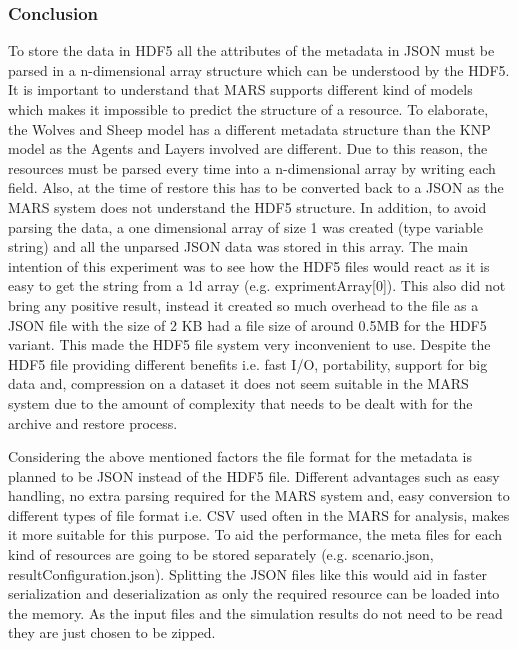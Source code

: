 \subsubsection{Conclusion}
    To store the data in HDF5 all the attributes of the metadata in JSON must be parsed in a n-dimensional array structure which can be understood by the HDF5. 
    It is important to understand that MARS supports different kind of models which makes it impossible to predict the structure of a resource. To elaborate, the
    Wolves and Sheep \cite{HAWHamburgMARS} model has a different metadata structure than the KNP \cite{HAWHamburgMARS} model as the Agents and Layers involved are 
    different. Due to this reason, the resources
    must be parsed every time into a n-dimensional array by writing each field. Also, at the time of restore this has to be converted back 
    to a JSON as the MARS system does not understand the HDF5 structure. In addition, to avoid parsing the data, 
    a one dimensional array of size 1 was created (type variable string) and all the unparsed JSON data
    was stored in this array. The main intention of this experiment was to see how the HDF5 files would react as it is easy to get the string from a 1d array 
    (e.g. exprimentArray[0]). This also did not bring any positive result, instead it created so much overhead to the file as a JSON file with the size of 2 KB
    had a file size of around 0.5MB for the HDF5 variant. This made the HDF5 file system very inconvenient to use.
    Despite the HDF5 file providing different benefits i.e. fast I/O, portability, support for big data and,
    compression on a dataset it does not seem suitable in the MARS system due to the amount of complexity that needs to be dealt with for the archive and restore process.
    

    Considering the above mentioned factors the file format for the metadata is planned to be JSON instead of the HDF5 file. Different advantages such as easy 
    handling, no extra parsing
    required for the MARS system and, easy conversion to different types of file format i.e. CSV used often in the MARS for analysis, makes it more suitable for this purpose. 
    To aid the performance, the meta files for each kind of resources
    are going to be stored separately (e.g. scenario.json, resultConfiguration.json). Splitting the JSON files like this would aid in faster serialization and 
    deserialization as only the required resource can be loaded into the memory. As the input files and the simulation results do not need to be read they are just chosen to be zipped.

